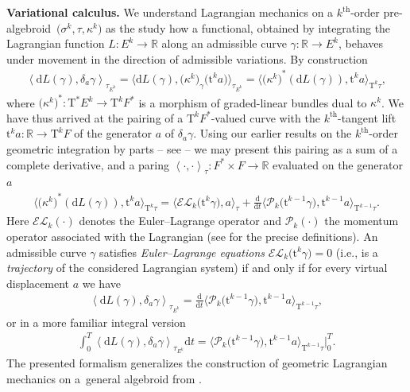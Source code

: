 \documentclass[pdftex]{sigma}
\newcommand{\thh}[1]{#1^{\mathrm{th}}} %
\newcommand{\R}{\mathbb{R}}
\newcommand{\dd}{\mathrm{d}}
\newcommand{\ra}{\rightarrow}
\newcommand{\del}{\delta}
\newcommand{\prealg}{pre-algebroid} %
\newcommand{\TT}[1]{\mathrm{T}^{#1}} %
\newcommand{\tclass}[2]{\bm{\mathrm{t}}^{#1}#2} %
\newcommand{\dbydt}{\frac{\mathrm{d}}{\mathrm{d}t}}
\def\<#1>{\left\langle #1\right\rangle}
\numberwithin{equation}{section}
\theoremstyle{definition}
\begin{document}
{\bf Variational calculus.} We understand Lagrangian mechanics on a $\thh{k}$-order \prealg\ $\big(\sigma^k,\tau, \kappa^k\big)$ as the study how a functional, obtained by integrating the Lagrangian function $L\colon E^k\ra \R$ along an admissible curve $\gamma\colon \R\ra E^k$, behaves under movement in the direction of admissible variations. By construction
\begin{gather}\label{eqn:var_formula_0}
\<\dd L(\gamma),\del_a\gamma>_{\tau_{E^k}}=\big\langle \dd L(\gamma),\big(\kappa^k\big)_{\gamma}\big(\tclass{k}{a}\big)\big\rangle_{\tau_{E^k}}=\big\langle { \big(\kappa^k\big)}^\ast(\dd L(\gamma)), \tclass{k}{a}\big\rangle_{\TT{k}\tau},
\end{gather}
where ${\big(\kappa^k\big)}^\ast\colon \TT\ast E^k\ra \TT{k} F^\ast$ is a morphism of graded-linear bundles dual to $ \kappa^k$. We have thus arrived at the pairing of a $\TT{k} F^\ast$-valued curve with the $\thh{k}$-tangent lift $\tclass{k}{a}\colon \R\ra\TT{k} F$ of the generator $a$ of $\del_a\gamma$. Using our earlier results on the $\thh{k}$-order geometric integration by parts -- see \cite{MJ_MR_higher_var_calc_2013} -- we may present this pairing as a sum of a complete derivative, and a paring $\<\cdot,\cdot>_{\tau}\colon F^\ast\times F\ra \R$ evaluated on the generator $a$
\begin{gather}\label{eqn:var_formula}\big\langle {\big(\kappa^k\big)}^\ast(\dd L(\gamma)), \tclass{k}{a}\big\rangle_{\TT{k}\tau}=\big\langle \mathcal{EL}_k\big(\tclass{k}{\gamma}\big),a\big\rangle_{\tau}+\dbydt{\big\langle \mathcal{P}_k\big( \tclass{k-1}{\gamma}\big),\tclass{k-1}a\big\rangle_{\TT{k-1}\tau}}.
\end{gather}
 Here $\mathcal{EL}_k(\cdot)$ denotes the Euler--Lagrange operator and $\mathcal{P}_k(\cdot)$ the momentum operator associated with the Lagrangian (see \cite{MJ_MR_higher_var_calc_2013} for the precise definitions). An admissible curve $\gamma$ satisfies \emph{Euler--Lagrange equations} \mbox{$\mathcal{EL}_k\big( \tclass k {\gamma}\big)=0$} (i.e., is a \emph{trajectory} of the considered Lagrangian system) if and only if for every virtual displacement $a$ we have
\begin{gather}\label{eqn:var_calc}
\<\dd L(\gamma),\del_a\gamma>_{\tau_{E^k}}=\dbydt{\big\langle \mathcal{P}_k\big( \tclass{k-1}{\gamma}\big), \tclass{k-1}a\big\rangle_{\TT{k-1}\tau}},
\end{gather}
or in a more familiar integral version
\begin{gather*}\int_0^T\<\dd L(\gamma),\del_a\gamma>_{\tau_{E^k}}\dd t=\big\langle\mathcal{P}_k\big( \tclass{k-1}{\gamma}\big) ,\tclass{k-1}a\big\rangle_{\TT{k-1}\tau}\big|^T_0.\end{gather*}
The presented formalism generalizes the construction of geometric Lagrangian mechanics on a~general algebroid from \cite{GG_var_calc_gen_alg_2008}.
\end{document}
